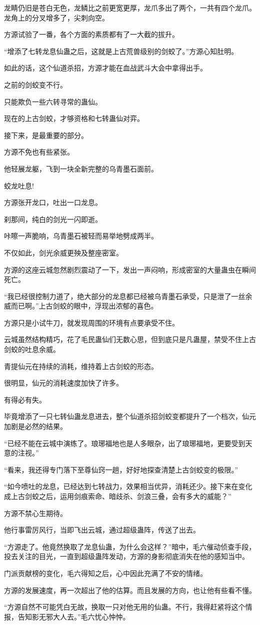 \begin{this_body}
龙睛仍旧是苍白无色，龙鳞比之前更宽更厚，龙爪多出了两个，一共有四个龙爪。龙角上的分叉增多了，尖刺向空。

方源试验了一番，各个方面的素质都有了一大截的拔升。

“增添了七转龙息仙蛊之后，这就是上古荒兽级别的剑蛟了。”方源心知肚明。

如此的话，这个仙道杀招，方源才能在血战武斗大会中拿得出手。

之前的剑蛟变不行。

只能欺负一些六转寻常的蛊仙。

现在的上古剑蛟，才够资格和七转蛊仙对弈。

接下来，是最重要的部分。

方源不免也有些紧张。

他轻展龙躯，飞到一块全新完整的乌青墨石面前。

蛟龙吐息!

方源张开龙口，吐出一口龙息。

刹那间，纯白的剑光一闪即逝。

咔嚓一声脆响，乌青墨石被轻而易举地劈成两半。

不仅如此，剑光余威更殃及整座密室。

方源的这座云城忽然剧烈震动了一下，发出一声闷响，形成密室的大量蛊虫在瞬间死亡。

“我已经很控制力道了，绝大部分的龙息都已经被乌青墨石承受，只是泄了一丝余威而已啊。”上古剑蛟的眼中，浮现出浓郁的喜色。

方源只是小试牛刀，就发现周围的环境有点要承受不住。

云城虽然结构精巧，花了毛民蛊仙们无数心思，但到底只是凡蛊屋，禁受不住上古剑蛟的吐息余威。

青提仙元在持续的消耗，维持着上古剑蛟的形态。

很明显，仙元的消耗速度加快了许多。

有得必有失。

毕竟增添了一只七转仙蛊龙息进去，整个仙道杀招剑蛟变都提升了一个档次，仙元加剧是必然的结果。

“已经不能在云城中演练了。琅琊福地也是人多眼杂，出了琅琊福地，更要受到天意的注视。”

“看来，我还得专门落下至尊仙窍一趟，好好地探查清楚上古剑蛟变的极限。”

“如今喷吐的龙息，已经达到七转战力，效果相当优异，消耗还少。接下来在变化成上古剑蛟之后，运用剑痕索命、暗歧杀、剑浪三叠，会有多大的威能？”

方源不禁心生期待。

他行事雷厉风行，当即飞出云城，通过超级蛊阵，传送了出去。

“方源走了。他竟然换取了龙息仙蛊，为什么会这样？”暗中，毛六催动侦查手段，投去关注的目光，一直到超级蛊阵发动，方源的身影彻底消失在他的感知当中。

门派贡献榜的变化，毛六得知之后，心中因此充满了不安的情绪。

方源的发展速度，再一次超出了他的估算。而且发展的方向，也让他有些看不懂。

“方源自然不可能凭白无故，换取一只对他无用的仙蛊。不行，我得赶紧将这个情报，告知影无邪大人去。”毛六忧心忡忡。

\end{this_body}

